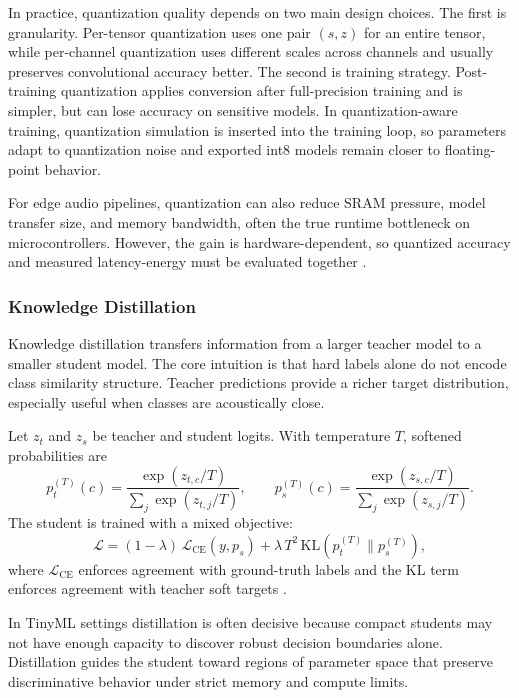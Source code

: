 \documentclass[a4paper,singleside,12pt]{report} %
\begin{document}
	\begin{sloppypar}
	In practice, quantization quality depends on two main design choices. The first is granularity. Per-tensor quantization uses one pair \((s,z)\) for an entire tensor, while per-channel quantization uses different scales across channels and usually preserves convolutional accuracy better. The second is training strategy. Post-training quantization applies conversion after full-precision training and is simpler, but can lose accuracy on sensitive models. In quantization-aware training, quantization simulation is inserted into the training loop, so parameters adapt to quantization noise and exported int8 models remain closer to floating-point behavior.
	\end{sloppypar}

	For edge audio pipelines, quantization can also reduce SRAM pressure, model transfer size, and memory bandwidth, often the true runtime bottleneck on microcontrollers. However, the gain is hardware-dependent, so quantized accuracy and measured latency-energy must be evaluated together \cite{tao2022energy}.
	\subsubsection{Knowledge Distillation}
	Knowledge distillation transfers information from a larger teacher model to a smaller student model. The core intuition is that hard labels alone do not encode class similarity structure. Teacher predictions provide a richer target distribution, especially useful when classes are acoustically close.

	Let \(z_t\) and \(z_s\) be teacher and student logits. With temperature \(T\), softened probabilities are
	\begin{equation}
		p_t^{(T)}(c)=\frac{\exp(z_{t,c}/T)}{\sum_j\exp(z_{t,j}/T)},\qquad
		p_s^{(T)}(c)=\frac{\exp(z_{s,c}/T)}{\sum_j\exp(z_{s,j}/T)}.
	\end{equation}
	The student is trained with a mixed objective:
	\begin{equation}
		\mathcal{L}=(1-\lambda)\,\mathcal{L}_{\mathrm{CE}}(y,p_s)+\lambda\,T^2\,\mathrm{KL}\!\left(p_t^{(T)}\|p_s^{(T)}\right),
	\end{equation}
	where \(\mathcal{L}_{\mathrm{CE}}\) enforces agreement with ground-truth labels and the KL term enforces agreement with teacher soft targets \cite{hinton2015distilling}.

	In TinyML settings distillation is often decisive because compact students may not have enough capacity to discover robust decision boundaries alone. Distillation guides the student toward regions of parameter space that preserve discriminative behavior under strict memory and compute limits.
\end{document}
